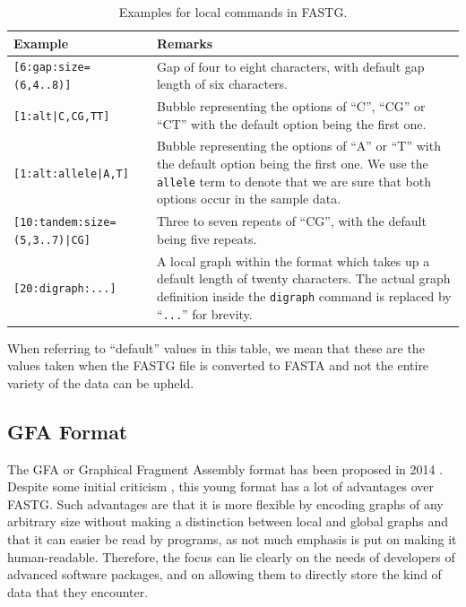 \documentclass[a4paper,12pt,twoside,BCOR=10mm]{scrbook}
\begin{document}
\begin{table}[htb]
\centering
\caption[Local commands in FASTG]{Examples for local commands in FASTG.}
\begin{tabularx}{1.0\textwidth}{ | l | X | }
\hline
\textbf{Example} & \textbf{Remarks} \\
\hline
\texttt{[6:gap:size=(6,4..8)]} & Gap of four to eight characters, with default gap length of six characters. \\
\hline
\texttt{[1:alt|C,CG,TT]} & Bubble representing the options of “C”, “CG” or “CT” with the default option being the first one. \\
\hline
\texttt{[1:alt:allele|A,T]} & Bubble representing the options of “A” or “T” with the default option being the first one. We use the \texttt{allele} term to denote that we are sure that both options occur in the sample data. \\
\hline
\texttt{[10:tandem:size=(5,3..7)|CG]} & Three to seven repeats of “CG”, with the default being five repeats. \\
\hline
\texttt{[20:digraph:...]} & A local graph within the format which takes up a default length of twenty characters. The actual graph definition inside the \texttt{digraph} command is replaced by “\texttt{...}” for brevity. \\
\hline
\end{tabularx}
\label{table:fastg_local_examples}
\end{table}

When referring to “default” values in this table, we mean that these are the values taken when the FASTG file
is converted to FASTA and not the entire variety of the data can be upheld.

\subsection{GFA Format}

The GFA or Graphical Fragment Assembly format
has been proposed in 2014 \citep{specGFA1,specGFA2}.
Despite some initial criticism \citep{knightGFA1},
this young format has a lot of advantages over FASTG.
Such advantages are that
it is more flexible by encoding graphs of any arbitrary size without
making a distinction between local and global graphs and that it can easier be read by programs,
as not much emphasis is put on making it human-readable.
Therefore, the focus can lie clearly on the needs of developers of advanced software packages,
and on allowing them to directly store the kind of data that they encounter.
\end{document}
